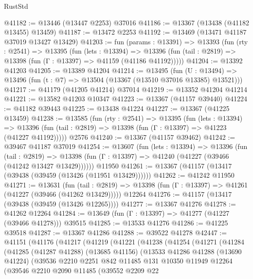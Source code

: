 \begin{lexlean}{RustStd}
\begin{coremodule}
@41182 := @13446 (@13447 @2253) @37016
@41186 := @13367 (@13438 (@41182 @13455) @13459)
@41187 := @13472 @2253
@41192 := @13469 (@13471 @41187 @37019 @13427 @13429)
@41203 := fun (params : @13391) =>
  @13393
    (fun (rty : @2541) =>
    @13395
      (fun (lets : @13394) =>
      @13396 (fun (tail : @2819) => @13398 (fun (Γ : @13397) => @41159 (@41186 @41192)))))
@41204 := @13392 @41203
@41205 := @13389 @41204
@41214 := @13495
    (fun (U : @13494) => @13496 (fun (t : @7) => @13504 (@13367 (@13510 @37016 @13385) @13521)))
@41217 := @41179 (@41205 @41214) @37014
@41219 := @13352 @41204 @41214
@41221 := @13582 @41203 @10347
@41223 := @13367 (@41157 @39440)
@41224 := @41182 @39443
@41225 := @13438 @41224
@41227 := @13367 (@41225 @13459)
@41238 := @13585
    (fun (rty : @2541) =>
    @13395
      (fun (lets : @13394) =>
      @13396 (fun (tail : @2819) => @13398 (fun (Γ : @13397) => @41223 (@41227 @41192)))))
    @2576
@41240 := @13367 (@41157 @39462)
@41242 := @39467 @41187 @37019
@41254 := @13607
    (fun (lets : @13394) =>
    @13396
      (fun (tail : @2819) =>
      @13398 (fun (Γ : @13397) => @41240 (@41227 (@39466 (@41242 @13427 @13429))))))
    @11950
@41261 := @13367 (@41157 (@13417 (@39438 (@39459 (@13426 (@11951 @13429))))))
@41262 := @41242 @11950
@41271 := @13631
    (fun (tail : @2819) => @13398 (fun (Γ : @13397) => @41261 (@41227 (@39466 (@41262 @13429)))))
    @12264
@41276 := @41157 (@13417 (@39438 (@39459 (@13426 @12265))))
@41277 := @13367 @41276
@41278 := @41262 @12264
@41284 := @13649 (fun (Γ : @13397) => @41277 (@41227 (@39466 @41278))) @39515
@41285 := @13533 @41276
@41286 := @41225 @39518
@41287 := @13367 @41286
@41288 := @39522 @41278
@42447 := @41151
    (@41176
      (@41217
        (@41219
          (@41221
            (@41238
              (@41254
                (@41271
                  (@41284
                    (@41285
                      (@41287 @41288)
                      (@13685 @41156)
                      (@13533
                        @41286
                        @41288
                        (@13690 @41224)
                        (@39536
                          @2210
                          @2251
                          @842
                          @11485
                          @131
                          @10350
                          @11949
                          @12264
                          (@39546
                            @2210
                            @2090
                            @11485
                            (@39552
                              @2209
                              @22

\end{coremodule}
\end{lexlean}
